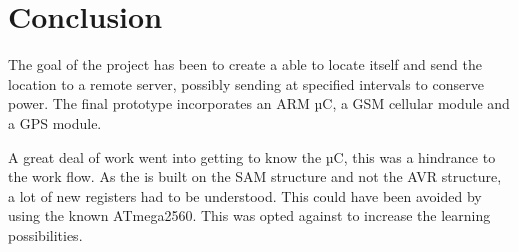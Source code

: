 
\chapter{Conclusion}
\label{chap:conclusion}
The goal of the project has been to create a \systemName able to locate itself and send the location to a remote server, possibly sending at specified intervals to conserve power.
The final prototype incorporates an ARM µC, a GSM cellular module and a GPS module.

A great deal of work went into getting to know the \SAMD µC, this was a hindrance to the work flow.
As the \SAMD is built on the SAM structure and not the AVR structure, a lot of new registers had to be understood.
This could have been avoided by using the known ATmega2560.
This was opted against to increase the learning possibilities.

\FloatBarrier